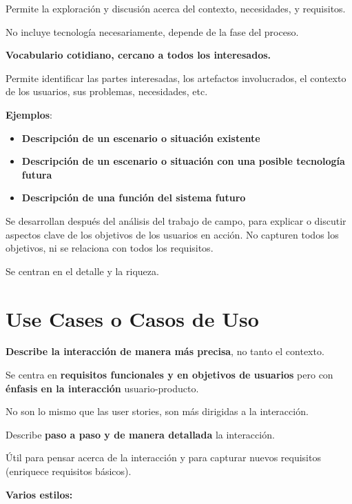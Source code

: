 \documentclass[12pt, twoside, openright]{report} %
\begin{document}
Permite la exploración y discusión acerca del contexto, necesidades, y
requisitos.

No incluye tecnología necesariamente, depende de la fase del proceso.

\textbf{Vocabulario cotidiano, cercano a todos los interesados.}

Permite identificar las partes interesadas, los artefactos involucrados,
el contexto de los usuarios, sus problemas, necesidades, etc.

\textbf{Ejemplos}:

\begin{itemize}
	\item \textbf{Descripción de un escenario o situación existente}
	\item \textbf{Descripción de un escenario o situación con una posible
		      tecnología futura}
	\item \textbf{Descripción de una función del sistema futuro}
\end{itemize}

Se desarrollan después del análisis del trabajo de campo, para explicar
o discutir aspectos clave de los objetivos de los usuarios en acción. No
capturen todos los objetivos, ni se relaciona con todos los requisitos.

Se centran en el detalle y la riqueza.

\section{Use Cases o Casos de Uso}

\textbf{Describe la interacción de manera más precisa}, no tanto el
contexto.

Se centra en \textbf{requisitos funcionales y en objetivos de usuarios} pero
con \textbf{énfasis en la interacción} usuario-producto.

No son lo mismo que las user stories, son más dirigidas a la
interacción.

Describe \textbf{paso a paso y de manera detallada} la interacción.

Útil para pensar acerca de la interacción y para capturar nuevos
requisitos (enriquece requisitos básicos).

\textbf{Varios estilos:}
\end{document}
